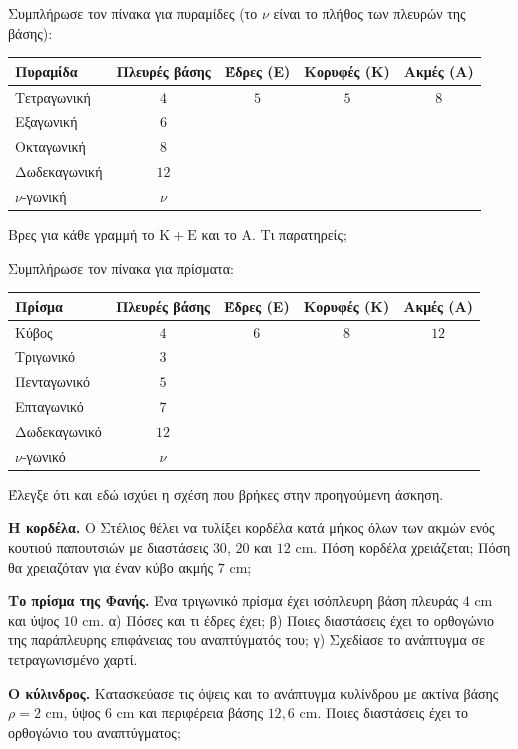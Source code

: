 \ex Συμπλήρωσε τον πίνακα για πυραμίδες (το $\nu$ είναι το πλήθος των πλευρών της βάσης):
\begin{center}
\renewcommand{\arraystretch}{1.3}
\begin{tabular}{@{}lcccc@{}}
\toprule
\textbf{Πυραμίδα} & \textbf{Πλευρές βάσης} & \textbf{Έδρες (Ε)} & \textbf{Κορυφές (Κ)} & \textbf{Ακμές (Α)}\\
\midrule
Τετραγωνική & $4$ & $5$ & $5$ & $8$\\
Εξαγωνική & $6$ & & & \\
Οκταγωνική & $8$ & & & \\
Δωδεκαγωνική & $12$ & & & \\
$\nu$-γωνική & $\nu$ & & & \\
\bottomrule
\end{tabular}
\end{center}
Βρες για κάθε γραμμή το $\mathrm{Κ}+\mathrm{Ε}$ και το $\mathrm{Α}$. Τι παρατηρείς;

\ex Συμπλήρωσε τον πίνακα για πρίσματα:
\begin{center}
\renewcommand{\arraystretch}{1.3}
\begin{tabular}{@{}lcccc@{}}
\toprule
\textbf{Πρίσμα} & \textbf{Πλευρές βάσης} & \textbf{Έδρες (Ε)} & \textbf{Κορυφές (Κ)} & \textbf{Ακμές (Α)}\\
\midrule
Κύβος & $4$ & $6$ & $8$ & $12$\\
Τριγωνικό & $3$ & & & \\
Πενταγωνικό & $5$ & & & \\
Επταγωνικό & $7$ & & & \\
Δωδεκαγωνικό & $12$ & & & \\
$\nu$-γωνικό & $\nu$ & & & \\
\bottomrule
\end{tabular}
\end{center}
Έλεγξε ότι και εδώ ισχύει η σχέση που βρήκες στην προηγούμενη άσκηση.

\ex \textbf{Η κορδέλα.} Ο Στέλιος θέλει να τυλίξει κορδέλα κατά μήκος όλων των ακμών ενός κουτιού παπουτσιών με διαστάσεις $30$, $20$ και $12$ cm. Πόση κορδέλα χρειάζεται; Πόση θα χρειαζόταν για έναν κύβο ακμής $7$ cm;

\ex \textbf{Το πρίσμα της Φανής.} Ένα τριγωνικό πρίσμα έχει ισόπλευρη βάση πλευράς $4$ cm και ύψος $10$ cm. α) Πόσες και τι έδρες έχει; β) Ποιες διαστάσεις έχει το ορθογώνιο της παράπλευρης επιφάνειας του αναπτύγματός του; γ) Σχεδίασε το ανάπτυγμα σε τετραγωνισμένο χαρτί.

\ex \textbf{Ο κύλινδρος.} Κατασκεύασε τις όψεις και το ανάπτυγμα κυλίνδρου με ακτίνα βάσης $\rho=2$ cm, ύψος $6$ cm και περιφέρεια βάσης $12{,}6$ cm. Ποιες διαστάσεις έχει το ορθογώνιο του αναπτύγματος;

